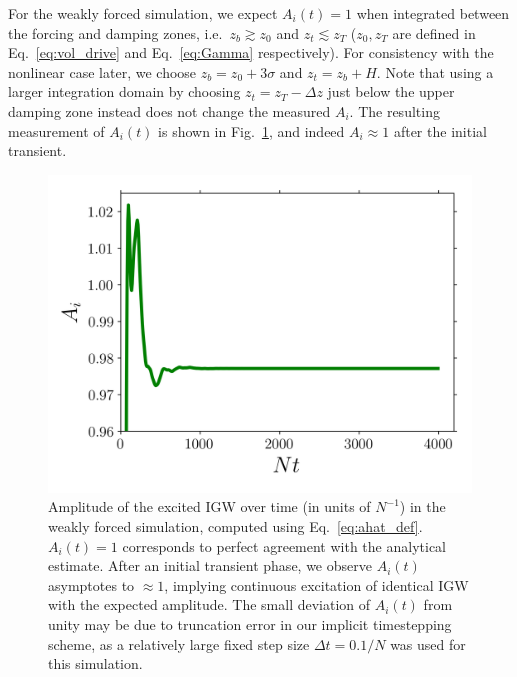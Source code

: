 \documentclass[
        fleqn,
        usenatbib,
    ]{mnras}
\begin{document}
For the weakly forced simulation, we expect
$A_i(t) = 1$ when integrated between the forcing and damping zones, i.e.\
$z_b \gtrsim z_0$ and $z_t \lesssim z_T$ ($z_0, z_T$ are defined in
Eq.~\eqref{eq:vol_drive} and Eq.~\eqref{eq:Gamma} respectively). For consistency
with the nonlinear case later, we choose $z_b = z_0 + 3\sigma$ and $z_t = z_b +
H$. Note that using a larger integration domain by choosing $z_t = z_T - \Delta
z$ just below the upper damping zone instead does not change the measured $A_i$.
The resulting measurement of $A_i(t)$ is shown in Fig.~\ref{fig:lin_amps}, and
indeed $A_i \approx 1$ after the initial transient.
\begin{figure}
    \centering
    \includegraphics[width=0.9\columnwidth]{plots/lin_amps.png}
    \caption{Amplitude of the excited IGW over time (in units of $N^{-1}$) in
    the weakly forced simulation, computed using Eq.~\eqref{eq:ahat_def}.
    $A_i(t) = 1$ corresponds to perfect agreement with the analytical estimate.
    After an initial transient phase, we observe $A_i(t)$ asymptotes to $\approx
    1$, implying continuous excitation of identical IGW with the expected
    amplitude. The small deviation of $A_i(t)$ from unity may be due to
    \textcolor{Corr}{truncation error in our implicit timestepping scheme}, as a
    relatively large fixed step size $\Delta t = 0.1/N$ was used for this
    simulation.}\label{fig:lin_amps}
\end{figure}
\end{document}
